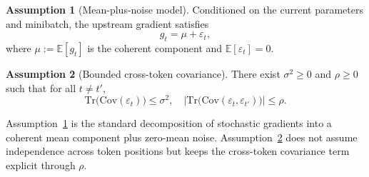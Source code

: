\documentclass{article}
\theoremstyle{plain}
\theoremstyle{definition}
\newtheorem{assumption}{Assumption}
\theoremstyle{remark}
\begin{document}
\begin{assumption}[Mean-plus-noise model]\label{assump:mean-noise-app}
Conditioned on the current parameters and minibatch, the upstream gradient satisfies
\[
    g_t = \mu + \varepsilon_t,
\]
where $\mu := \mathbb{E}[g_t]$ is the coherent component and $\mathbb{E}[\varepsilon_t]=0$.
\end{assumption}

\begin{assumption}[Bounded cross-token covariance]\label{assump:cov-app}
There exist $\sigma^2 \ge 0$ and $\rho \ge 0$ such that for all $t \neq t'$,
\[
    \mathrm{Tr}\!\bigl(\mathrm{Cov}(\varepsilon_t)\bigr) \le \sigma^2,
    \quad
    \bigl|\mathrm{Tr}\!\bigl(\mathrm{Cov}(\varepsilon_t,\varepsilon_{t'})\bigr)\bigr| \le \rho.
\]
\end{assumption}

Assumption~\ref{assump:mean-noise-app} is the standard decomposition of stochastic gradients into a coherent mean component plus zero-mean noise. Assumption~\ref{assump:cov-app} does not assume independence across token positions but keeps the cross-token covariance term explicit through $\rho$. 
\end{document}
